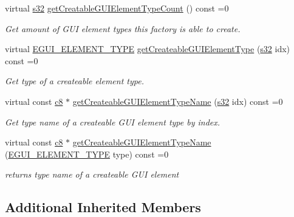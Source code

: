 \begin{DoxyCompactItemize}
\mbox{\label{classirr_1_1gui_1_1IGUIElementFactory_aae56378de5264978e70d11a36fff02e9}} 
virtual \hyperlink{namespaceirr_ac66849b7a6ed16e30ebede579f9b47c6}{s32} \hyperlink{classirr_1_1gui_1_1IGUIElementFactory_aae56378de5264978e70d11a36fff02e9}{get\+Creatable\+G\+U\+I\+Element\+Type\+Count} () const =0
\begin{DoxyCompactList}\small\item\em Get amount of G\+UI element types this factory is able to create. \end{DoxyCompactList}\item 
virtual \hyperlink{namespaceirr_1_1gui_ae4d66df0ecf4117cdbcf9f22404bd254}{E\+G\+U\+I\+\_\+\+E\+L\+E\+M\+E\+N\+T\+\_\+\+T\+Y\+PE} \hyperlink{classirr_1_1gui_1_1IGUIElementFactory_a9318ddb2d0d971551db4c050c3f99a2f}{get\+Createable\+G\+U\+I\+Element\+Type} (\hyperlink{namespaceirr_ac66849b7a6ed16e30ebede579f9b47c6}{s32} idx) const =0
\begin{DoxyCompactList}\small\item\em Get type of a createable element type. \end{DoxyCompactList}\item 
virtual const \hyperlink{namespaceirr_a9395eaea339bcb546b319e9c96bf7410}{c8} $\ast$ \hyperlink{classirr_1_1gui_1_1IGUIElementFactory_aa8007c17ea40b74666c1d04c9d4de85f}{get\+Createable\+G\+U\+I\+Element\+Type\+Name} (\hyperlink{namespaceirr_ac66849b7a6ed16e30ebede579f9b47c6}{s32} idx) const =0
\begin{DoxyCompactList}\small\item\em Get type name of a createable G\+UI element type by index. \end{DoxyCompactList}\item 
virtual const \hyperlink{namespaceirr_a9395eaea339bcb546b319e9c96bf7410}{c8} $\ast$ \hyperlink{classirr_1_1gui_1_1IGUIElementFactory_a1e692e1f746ee69815bf25981ee0facf}{get\+Createable\+G\+U\+I\+Element\+Type\+Name} (\hyperlink{namespaceirr_1_1gui_ae4d66df0ecf4117cdbcf9f22404bd254}{E\+G\+U\+I\+\_\+\+E\+L\+E\+M\+E\+N\+T\+\_\+\+T\+Y\+PE} type) const =0
\begin{DoxyCompactList}\small\item\em returns type name of a createable G\+UI element \end{DoxyCompactList}\end{DoxyCompactItemize}
\subsection*{Additional Inherited Members}


